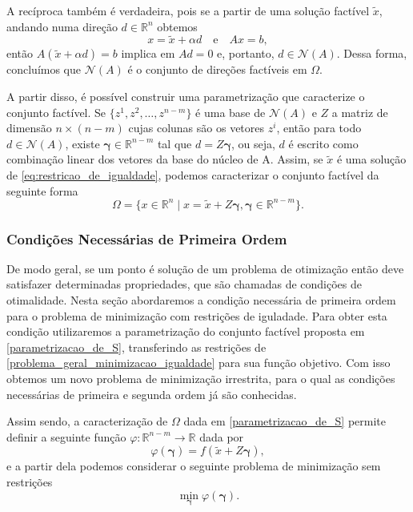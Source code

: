 \documentclass[12pt,a4paper]{scrartcl}
\def\RR{\mathds{R}}
\theoremstyle{definition}%
\begin{document}
A recíproca também é verdadeira, pois se a partir de uma solução factível $\tilde{x}$, andando numa direção $d \in \RR^{n}$ obtemos
\[
x=\tilde{x} + \alpha d \quad \text{e} \quad Ax=b ,
\]
então $A(\tilde{x} + \alpha d) = b$ implica em $Ad = 0$ e, portanto, $d \in \mathcal{N}(A)$. Dessa forma, concluímos que $\mathcal{N}(A)$ é o conjunto de direções factíveis em $\Omega$.

A partir disso, é possível construir uma parametrização que caracterize o conjunto factível. Se $\{ z^{1}, z^{2}, \ldots , z^{n-m} \}$ é uma base de $\mathcal{N}(A)$ e $Z$ a matriz de dimensão $n\times (n-m)$ cujas colunas são os vetores $z^{i}$, então para todo $d \in \mathcal{N}(A)$, existe $\boldsymbol{\gamma} \in \RR^{n-m}$ tal que $d=Z\boldsymbol{\gamma}$, ou seja, $d$ é escrito como combinação linear dos vetores da base do núcleo de A. Assim, se $\tilde{x}$ é uma solução de \eqref{eq:restricao_de_igualdade}, podemos caracterizar o conjunto factível da seguinte forma
\[ \label{parametrizacao_de_S}
\Omega = \{ x \in \RR^{n} \mid x=\tilde{x} + Z\boldsymbol{\gamma} , \boldsymbol{\gamma} \in \RR^{n-m} \} .
\]

\subsubsection{Condições Necessárias de Primeira Ordem}

De modo geral, se um ponto é solução de um problema de otimização então deve satisfazer determinadas propriedades, que são chamadas de condições de otimalidade. Nesta seção abordaremos a condição necessária de primeira ordem para o problema de minimização com restrições de iguladade. Para obter esta condição utilizaremos a parametrização do conjunto factível proposta em \eqref{parametrizacao_de_S}, transferindo as restrições de \eqref{problema_geral_minimizacao_igualdade} para sua função objetivo. Com isso obtemos um novo problema de minimização irrestrita, para o qual as condições necessárias de primeira e segunda ordem já são conhecidas.

Assim sendo, a caracterização de $\Omega$ dada em \eqref{parametrizacao_de_S} permite definir a seguinte função $\varphi : \RR^{n-m} \rightarrow \RR$ dada por
\[ \label{funcao_phi_restricoes_igualdade}
\varphi (\boldsymbol{\gamma}) = f(\tilde{x} + Z\boldsymbol{\gamma}),
\]
e a partir dela podemos considerar o seguinte problema de minimização sem restrições
\[ \label{problema_minimizacao_irrestrita_phi}
\min_{\boldsymbol{\gamma}} \varphi (\boldsymbol{\gamma}) .
\]
\end{document}
